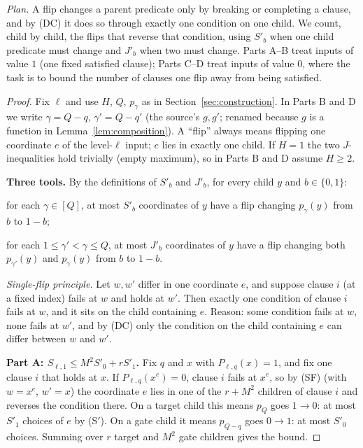 \documentclass[11pt]{article}
\theoremstyle{definition}
\theoremstyle{remark}
\begin{document}
\emph{Plan.} A flip changes a parent predicate only by breaking or completing
a clause, and by (DC) it does so through exactly one condition on one child.
We count, child by child, the flips that reverse that condition, using
$S'_b$ when one child predicate must change and $J'_b$ when two must change.
Parts A--B treat inputs of value $1$ (one fixed satisfied clause);
Parts C--D treat inputs of value $0$, where the task is to bound the number
of clauses one flip away from being satisfied.

\begin{proof}
Fix $\ell$ and use $H$, $Q$, $p_\gamma$ as in
Section~\ref{sec:construction}. In Parts B and D we write
$\gamma=Q-q$, $\gamma'=Q-q'$ (the source's $g,g'$; renamed because $g$ is a
function in Lemma~\ref{lem:composition}). A ``flip'' always means flipping one
coordinate $e$ of the level-$\ell$ input; $e$ lies in exactly one child. If
$H=1$ the two $J$-inequalities hold trivially (empty maximum), so in Parts B
and D assume $H\ge2$.

\smallskip\noindent\textbf{Three tools.}
By the definitions of $S'_b$ and $J'_b$, for every child $y$ and $b\in\{0,1\}$:
\begin{description}[leftmargin=*,itemsep=1pt]
\item[\textup{(S$'$)}] for each $\gamma\in[Q]$, at most $S'_b$ coordinates of
 $y$ have a flip changing $p_\gamma(y)$ from $b$ to $1-b$;
\item[\textup{(J$'$)}] for each $1\le\gamma'<\gamma\le Q$, at most $J'_b$
 coordinates of $y$ have a flip changing both $p_{\gamma'}(y)$ and
 $p_\gamma(y)$ from $b$ to $1-b$.
\item[\textup{(SF)}] \emph{Single-flip principle.} Let $w,w'$ differ in one
 coordinate $e$, and suppose clause $i$ (at a fixed index) fails at $w$ and
 holds at $w'$. Then exactly one condition of clause $i$ fails at $w$, and it
 sits on the child containing $e$. Reason: some condition fails at $w$, none
 fails at $w'$, and by (DC) only the condition on the child containing $e$ can
 differ between $w$ and $w'$.
\end{description}

\smallskip\noindent\textbf{Part A: $S_{\ell,1}\le M^2S'_0+rS'_1$.}
Fix $q$ and $x$ with $P_{\ell,q}(x)=1$, and fix one clause $i$ that holds at
$x$. If $P_{\ell,q}(x^e)=0$, clause $i$ fails at $x^e$, so by (SF) (with
$w=x^e$, $w'=x$) the coordinate $e$ lies in one of the $r+M^2$ children of
clause $i$ and reverses the condition there. On a target child this means
$p_Q$ goes $1\to0$: at most $S'_1$ choices of $e$ by (S$'$). On a gate child
it means $p_{Q-q}$ goes $0\to1$: at most $S'_0$ choices. Summing over $r$
target and $M^2$ gate children gives the bound.


\end{proof}
\end{document}
